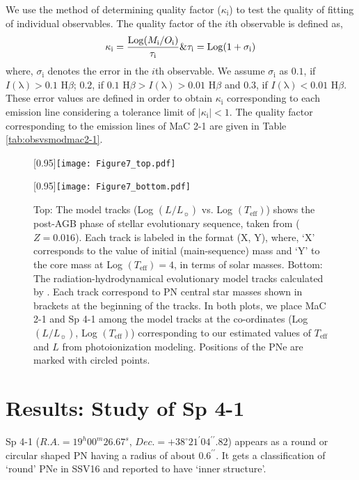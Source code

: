 \documentclass[a4paper,fleqn,usenatbib]{mnras}
\begin{document}
We use the method of determining quality factor ($\kappa_\mathrm{i}$) \citep{2009A&A...507.1517M} to test the quality of fitting of individual observables. The quality factor of the $i$th observable is defined as, 
\begin{equation}
\kappa_\mathrm{i}=\frac{\mathrm{Log}(M_\mathrm{i}/O_\mathrm{i})}{\tau_\mathrm{i}} \\ \& \\ \tau_\mathrm{i}=\mathrm{Log}(1+\sigma_\mathrm{i})
\end{equation}
where, $\sigma_\mathrm{i}$ denotes the error in the $i$th observable. We assume $\sigma_\mathrm{i}$ as $0.1$, if $I(\mathrm{\lambda})>0.1$ $\mathrm{H}\beta$; $0.2$, if $0.1$ $\mathrm{H}\beta>I(\mathrm{\lambda})>0.01$ $\mathrm{H}\beta$ and $0.3$, if $I(\mathrm{\lambda})<0.01$ $\mathrm{H}\beta$. These error values are defined in order to obtain $\kappa_\mathrm{i}$ corresponding to each emission line considering a tolerance limit of $\mid{\kappa_\mathrm{i}}\mid<1$. The quality factor corresponding to the emission lines of MaC 2-1 are given in Table \ref{tab:obsvsmodmac2-1}.

\begin{figure}
\centering
\scalebox{0.95}[0.95]{\texttt{[image: Figure7\_top.pdf]}}

\scalebox{0.95}[0.95]{\texttt{[image: Figure7\_bottom.pdf]}}
 \caption{Top: The model tracks (Log $(L/L_{\sun})$ vs. Log $(T_\mathrm{eff})$) shows the post-AGB phase of stellar evolutionary sequence, taken from \citet{1994ApJS...92..125V} ($Z=0.016$). Each track is labeled in the format (X, Y), where, `X' corresponds to the value of initial (main-sequence) mass and `Y' to the core mass at Log $(T_\mathrm{eff})=4$, in terms of solar masses. Bottom: The radiation-hydrodynamical evolutionary model tracks calculated by \citet{2013A&A...558A..78J}. Each track correspond to PN central star masses shown in brackets at the beginning of the tracks. In both plots, we place MaC 2-1 and Sp 4-1 among the model tracks at the co-ordinates (Log $(L/L_{\sun})$, Log $(T_\mathrm{eff})$) corresponding to our estimated values of $T_\mathrm{eff}$ and $L$ from photoionization modeling. Positions of the PNe are marked with circled points.}
 \label{fig:massfunction}
\end{figure}
       
\section{Results: Study of Sp 4-1} \label{sec:sp4-1}
Sp 4-1 ($R.A.=19^h00^m26.67^s$, $Dec.=+38^{\circ}21^{\prime}04^{\prime\prime}.82$) appears as a round or circular shaped PN having a radius of about $0.6^{\prime\prime}$. It gets a classification of `round' PNe in SSV16 and reported to have `inner structure'. 
\end{document}
